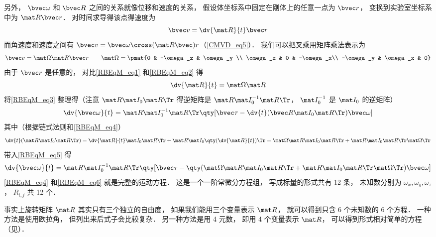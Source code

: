 另外， $\bvec \omega$ 和 $\bvec R$ 之间的关系就像位移和速度的关系， 假设体坐标系中固定在刚体上的任意一点为 $\bvec r$， 变换到实验室坐标系中为 $\mat R \bvec r$． 对时间求导得该点得速度为
\begin{equation}\label{RBEqM_eq1}
\bvec v = \dv{\mat R}{t} \bvec r
\end{equation}
而角速度和速度之间有 $\bvec v = \bvec \omega \cross (\mat R \bvec) r$（\autoref{CMVD_eq5}）． 我们可以把叉乘用矩阵乘法表示为 %
\begin{equation}\label{RBEqM_eq2}
\bvec v = \mat\Omega \mat R \bvec r
\qquad
\mat\Omega = \pmat{0 & -\omega_z & \omega_y \\ \omega_z & 0 & -\omega_x\\ -\omega_y & \omega_x & 0}
\end{equation}
由于 $\bvec r$ 是任意的， 对比\autoref{RBEqM_eq1} 和\autoref{RBEqM_eq2} 得
\begin{equation}\label{RBEqM_eq4}
\dv{\mat R}{t} = \mat\Omega \mat R
\end{equation}
将\autoref{RBEqM_eq3} 整理得（注意 $\mat R \mat I_0 \mat R\Tr$ 得逆矩阵是 $\mat R \mat I_0^{-1} \mat R\Tr$， $\mat I_0^{-1}$ 是 $\mat I_0$ 的逆矩阵）%
\begin{equation}\label{RBEqM_eq5}
\dv{\bvec \omega}{t} = \mat R \mat I_0^{-1} \mat R\Tr \qty[\bvec \tau  - \dv{t} (\bvec R\mat I_0 \mat R\Tr) \bvec \omega]
\end{equation}
其中（根据链式法则和\autoref{RBEqM_eq4}）
\begin{equation}
\dv{t}(\mat R \mat I_0 \mat R\Tr) = \dv{\mat R}{t} \mat I_0 \mat R\Tr + \mat R \mat I_0 \qty(\dv{\mat R}{t})\Tr = \mat \Omega \mat R \mat I_0 \mat R\Tr + \mat R \mat I_0 \mat R\Tr \mat \Omega\Tr
\end{equation}
带入\autoref{RBEqM_eq5} 得
\begin{equation}\label{RBEqM_eq6}
\dv{\bvec \omega}{t} = \mat R \mat I_0^{-1} \mat R\Tr \qty[\bvec \tau  - \qty(\mat \Omega \mat R \mat I_0 \mat R\Tr + \mat R \mat I_0 \mat R\Tr \mat \Omega\Tr) \bvec \omega]
\end{equation}
\autoref{RBEqM_eq4} 和\autoref{RBEqM_eq6} 就是完整的运动方程． 这是一个一阶常微分方程组， 写成标量的形式共有 12 条， 未知数分别为 $\omega_x, \omega_y, \omega_z$， $R_{i,j}$ 共 12 个．

事实上旋转矩阵 $\mat R$ 其实只有三个独立的自由度， 如果我们能用三个变量表示 $\mat R$， 就可以得到只含 6 个未知数的 6 个方程． 一种方法是使用欧拉角， 但列出来后式子会比较复杂． 另一种方法是用 4 元数， 即用 4 个变量表示 $\mat R$， 可以得到形式相对简单的方程（见）．
